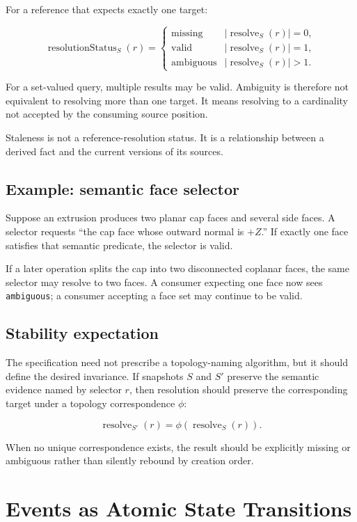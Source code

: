 \documentclass[11pt]{article}
\newcommand{\Type}[1]{\texttt{#1}}
\begin{document}
For a reference that expects exactly one target:

\[
\operatorname{resolutionStatus}_S(r)=
\begin{cases}
\mathrm{missing} & |\operatorname{resolve}_S(r)|=0,\\
\mathrm{valid} & |\operatorname{resolve}_S(r)|=1,\\
\mathrm{ambiguous} & |\operatorname{resolve}_S(r)|>1.
\end{cases}
\]

For a set-valued query, multiple results may be valid. Ambiguity is therefore
not equivalent to resolving more than one target. It means resolving to a
cardinality not accepted by the consuming source position.

Staleness is not a reference-resolution status. It is a relationship between a
derived fact and the current versions of its sources.

\subsection{Example: semantic face selector}

Suppose an extrusion produces two planar cap faces and several side faces. A
selector requests ``the cap face whose outward normal is $+Z$.'' If exactly one
face satisfies that semantic predicate, the selector is valid.

If a later operation splits the cap into two disconnected coplanar faces, the
same selector may resolve to two faces. A consumer expecting one face now sees
\Type{ambiguous}; a consumer accepting a face set may continue to be valid.

\subsection{Stability expectation}

The specification need not prescribe a topology-naming algorithm, but it should
define the desired invariance. If snapshots $S$ and $S'$ preserve the semantic
evidence named by selector $r$, then resolution should preserve the
corresponding target under a topology correspondence $\phi$:

\[
\operatorname{resolve}_{S'}(r)
=
\phi(\operatorname{resolve}_S(r)).
\]

When no unique correspondence exists, the result should be explicitly missing
or ambiguous rather than silently rebound by creation order.

\section{Events as Atomic State Transitions}
\end{document}
